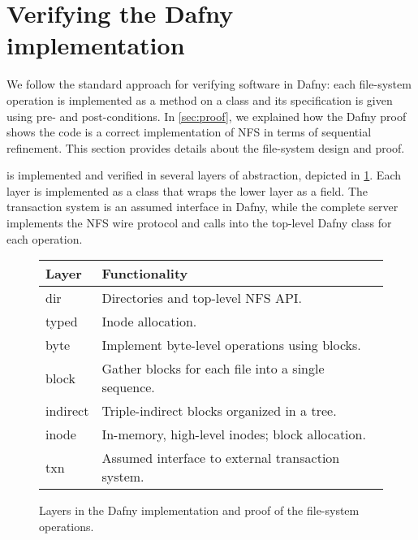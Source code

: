 \section{Verifying the Dafny implementation}%
\label{sec:design}

We follow the standard approach for verifying software in Dafny: each
file-system operation is implemented as a method on a class and its
specification is given using pre- and post-conditions. In \cref{sec:proof},
we explained how the Dafny proof shows the code is a correct implementation of NFS in terms of sequential refinement. This
section provides details about the file-system design and proof.


\sys is implemented and verified in several layers of abstraction, depicted in
\cref{fig:dafny-layers}. Each layer is implemented as a class that wraps the
lower layer as a field. The transaction system is an assumed interface in Dafny,
while the complete server implements the NFS wire protocol and calls into the
top-level Dafny class for each operation.


\begin{figure}
\small \centering
\begin{tabular}{ll}
  \toprule
  \textbf{Layer} & \textbf{Functionality} \\
  \midrule
  dir & Directories and top-level NFS API. \\
  typed & Inode allocation. \\
  byte & Implement byte-level operations using blocks. \\
  block & Gather blocks for each file into a single sequence. \\
  indirect & Triple-indirect blocks organized in a tree. \\
  inode & In-memory, high-level inodes; block allocation. \\
  txn & Assumed interface to external transaction system. \\
  \bottomrule
\end{tabular}
\caption{Layers in the Dafny implementation and proof of the file-system
operations.}
\label{fig:dafny-layers}
\end{figure}

